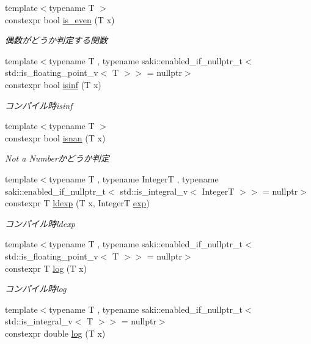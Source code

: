 \begin{DoxyCompactItemize}
{\footnotesize template$<$typename T $>$ }\\constexpr bool \mbox{\hyperlink{namespacesaki_a7fa7e4ec89e948874e42926e91d6dd4e}{is\+\_\+even}} (T x)
\begin{DoxyCompactList}\small\item\em 偶数がどうか判定する関数 \end{DoxyCompactList}\item 
{\footnotesize template$<$typename T , typename saki\+::enabled\+\_\+if\+\_\+nullptr\+\_\+t$<$ std\+::is\+\_\+floating\+\_\+point\+\_\+v$<$ T $>$$>$  = nullptr$>$ }\\constexpr bool \mbox{\hyperlink{namespacesaki_a2168418bb30a857d2d018d0d05c7ace0}{isinf}} (T x)
\begin{DoxyCompactList}\small\item\em コンパイル時isinf \end{DoxyCompactList}\item 
{\footnotesize template$<$typename T $>$ }\\constexpr bool \mbox{\hyperlink{namespacesaki_a56ac7ef1477743d3bb044e2cf8f6d612}{isnan}} (T x)
\begin{DoxyCompactList}\small\item\em Not a Numberかどうか判定 \end{DoxyCompactList}\item 
{\footnotesize template$<$typename T , typename IntegerT , typename saki\+::enabled\+\_\+if\+\_\+nullptr\+\_\+t$<$ std\+::is\+\_\+integral\+\_\+v$<$ Integer\+T $>$$>$  = nullptr$>$ }\\constexpr T \mbox{\hyperlink{namespacesaki_a03b7a22945dcbce6e2bb0593025c90c4}{ldexp}} (T x, IntegerT \mbox{\hyperlink{namespacesaki_abc1268e543a60d43b04f1418f5ef3e41}{exp}})
\begin{DoxyCompactList}\small\item\em コンパイル時ldexp \end{DoxyCompactList}\item 
{\footnotesize template$<$typename T , typename saki\+::enabled\+\_\+if\+\_\+nullptr\+\_\+t$<$ std\+::is\+\_\+floating\+\_\+point\+\_\+v$<$ T $>$$>$  = nullptr$>$ }\\constexpr T \mbox{\hyperlink{namespacesaki_a64136b916afd50ceb9bfb93ae12c63fb}{log}} (T x)
\begin{DoxyCompactList}\small\item\em コンパイル時log \end{DoxyCompactList}\item 
{\footnotesize template$<$typename T , typename saki\+::enabled\+\_\+if\+\_\+nullptr\+\_\+t$<$ std\+::is\+\_\+integral\+\_\+v$<$ T $>$$>$  = nullptr$>$ }\\constexpr double \mbox{\hyperlink{namespacesaki_a7f260fd4311e2bd21ae770f8aed6fa81}{log}} (T x)

\end{DoxyCompactItemize}
